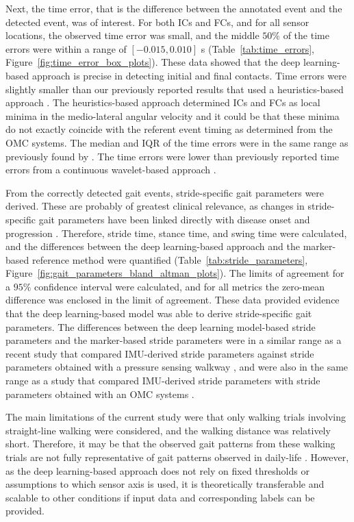 \documentclass[sensors,article,submit,pdftex,moreauthors]{Definitions/mdpi}
\begin{document}
Next, the time error, that is the difference between the annotated event and the detected event, was of interest. For both ICs and FCs, and for all sensor locations, the observed time error was small, and the middle $50\%$ of the time errors were within a range of $\left[-0.015,0.010\right]$ s (Table~\ref{tab:time_errors}, Figure~\ref{fig:time_error_box_plots}). These data showed that the deep learning-based approach is precise in detecting initial and final contacts. Time errors were slightly smaller than our previously reported results \cite{Romijnders2021} that used a heuristics-based approach \cite{Salarian2004}. The heuristics-based approach determined ICs and FCs as local minima in the medio-lateral angular velocity \cite{Salarian2004} and it could be that these minima do not exactly coincide with the referent event timing as determined from the OMC systems. The median and IQR of the time errors were in the same range as previously found by \cite{Gadaleta2019}. The time errors were lower than previously reported time errors from a continuous wavelet-based approach \cite{Ji2019}.

From the correctly detected gait events, stride-specific gait parameters were derived. These are probably of greatest clinical relevance, as changes in stride-specific gait parameters have been linked directly with disease onset and progression \cite{DelDin2019,Koenig2017,Bertoli2018,SchroederVon1995,Mohan2021,Griskevicius2016,Flachenecker2019}. Therefore, stride time, stance time, and swing time were calculated, and the differences between the deep learning-based approach and the marker-based reference method were quantified (Table~\ref{tab:stride_parameters}, Figure~\ref{fig:gait_parameters_bland_altman_plots}). The limits of agreement for a $95\%$ confidence interval were calculated, and for all metrics the zero-mean difference was enclosed in the limit of agreement. These data provided evidence that the deep learning-based model was able to derive stride-specific gait parameters. The differences between the deep learning model-based stride parameters and the marker-based stride parameters were in a similar range as a recent study that compared IMU-derived stride parameters against stride parameters obtained with a pressure sensing walkway \cite{Niswander2021,Gadaleta2019}, and were also in the same range as a study that compared IMU-derived stride parameters with stride parameters obtained with an OMC systems \cite{Carcreff2018}.

The main limitations of the current study were that only walking trials involving straight-line walking were considered, and the walking distance was relatively short. Therefore, it may be that the observed gait patterns from these walking trials are not fully representative of gait patterns observed in daily-life \cite{Hillel2019,Warmerdam2020,Atrsaei2021}. However, as the deep learning-based approach does not rely on fixed thresholds or assumptions to which sensor axis is used, it is theoretically transferable and scalable to other conditions if input data and corresponding labels can be provided. 
\end{document}
